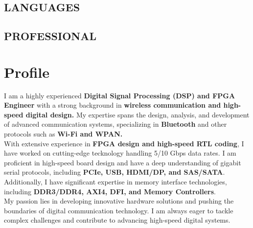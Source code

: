 \documentclass[10pt, a4paper]{article}
\begin{document}
\makeprofile

\begincols






\subsection{LANGUAGES}
\langcircles

\subsection{PROFESSIONAL}
\proskills


\switchcols %

\section{Profile}
I am a highly experienced \textbf{Digital Signal Processing (DSP) and FPGA Engineer} with a strong background in \textbf{wireless communication and 
high-speed digital design.} My expertise spans the design, analysis, and development of advanced communication systems, specializing in \textbf{Bluetooth} and 
other protocols such as \textbf{Wi-Fi and WPAN.}\\
With extensive experience in \textbf{FPGA design and high-speed RTL coding}, I have worked on cutting-edge tecknology handling 5/10 Gbps data rates. 
I am proficient in high-speed board design and have a deep understanding of gigabit serial protocols, including \textbf{PCIe, USB, HDMI/DP, and SAS/SATA}. 
Additionally, I have significant expertise in memory interface technologies, including \textbf{DDR3/DDR4, AXI4, DFI, and Memory Controllers}.\\
My passion lies in developing innovative hardware solutions and pushing the boundaries of digital communication technology. 
I am always eager to tackle complex challenges and contribute to advancing high-speed digital systems.
\end{document}
